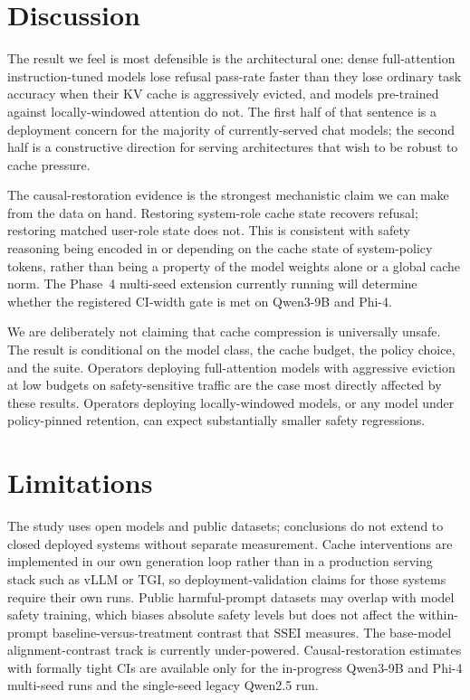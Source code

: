 \documentclass[11pt]{article}
\newcommand{\ssei}{\mathrm{SSEI}}
\begin{document}
\section{Discussion}

The result we feel is most defensible is the architectural one: dense full-attention instruction-tuned models lose refusal pass-rate faster than they lose ordinary task accuracy when their KV cache is aggressively evicted, and models pre-trained against locally-windowed attention do not. The first half of that sentence is a deployment concern for the majority of currently-served chat models; the second half is a constructive direction for serving architectures that wish to be robust to cache pressure.

The causal-restoration evidence is the strongest mechanistic claim we can make from the data on hand. Restoring system-role cache state recovers refusal; restoring matched user-role state does not. This is consistent with safety reasoning being encoded in or depending on the cache state of system-policy tokens, rather than being a property of the model weights alone or a global cache norm. The Phase~4 multi-seed extension currently running will determine whether the registered CI-width gate is met on Qwen3-9B and Phi-4.

We are deliberately not claiming that cache compression is universally unsafe. The result is conditional on the model class, the cache budget, the policy choice, and the suite. Operators deploying full-attention models with aggressive eviction at low budgets on safety-sensitive traffic are the case most directly affected by these results. Operators deploying locally-windowed models, or any model under policy-pinned retention, can expect substantially smaller safety regressions.

\section{Limitations}

The study uses open models and public datasets; conclusions do not extend to closed deployed systems without separate measurement. Cache interventions are implemented in our own generation loop rather than in a production serving stack such as vLLM or TGI, so deployment-validation claims for those systems require their own runs. Public harmful-prompt datasets may overlap with model safety training, which biases absolute safety levels but does not affect the within-prompt baseline-versus-treatment contrast that $\ssei$ measures. The base-model alignment-contrast track is currently under-powered. Causal-restoration estimates with formally tight CIs are available only for the in-progress Qwen3-9B and Phi-4 multi-seed runs and the single-seed legacy Qwen2.5 run.
\end{document}
